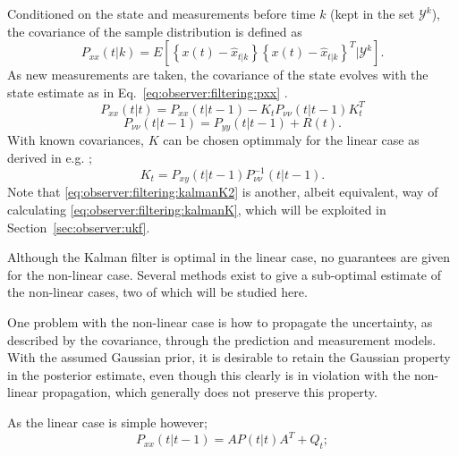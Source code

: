     Conditioned on the state and measurements before time $k$ (kept in the set $\mathcal{Y}^{k}$), the
    covariance of the sample distribution is defined as
    \begin{equation}
        P_{xx}(t|k) = E \left[ \left\lbrace x(t) - \hat{x}_{t|k} \right\rbrace
                               \left\lbrace x(t) - \hat{x}_{t|k} \right\rbrace^{T}
                               | \mathcal{Y}^{k} \right] .
    \end{equation}
    As new measurements are taken, the covariance of the state evolves
    with the state estimate as in Eq.~\eqref{eq:observer:filtering:pxx} \citep{Julier95anewapproach}.
    \begin{equation}
        \label{eq:observer:filtering:pxx}
        P_{xx}(t|t) = P_{xx}(t|t-1) - K_{t}P_{\nu\nu}(t|t-1)K_{t}^{T}
    \end{equation}
    \begin{equation}
        \label{eq:observer:filtering:pnunu}
        P_{\nu\nu}(t|t-1) = P_{yy}(t|t-1) + R(t) .
    \end{equation}
    With known covariances, $K$ can be chosen optimmaly for the linear case as derived in e.g. \citep{gustafsson2010statistical};
    \begin{equation}
        \label{eq:observer:filtering:kalmanK2}
        K_{t} = P_{xy}(t|t-1)P_{\nu\nu}^{-1}(t|t-1).
    \end{equation}
    Note that \eqref{eq:observer:filtering:kalmanK2} is another, albeit equivalent,
    way of calculating \eqref{eq:observer:filtering:kalmanK}, which will be exploited
    in Section~\ref{sec:observer:ukf}.

    Although the Kalman filter is optimal in the linear case, no guarantees are given for the non-linear case.
    Several methods exist to give a sub-optimal estimate of the non-linear cases,
    two of which will be studied here.

    One problem with the non-linear case is how to propagate the uncertainty,
    as described by the covariance, through the prediction and measurement models.
    With the assumed Gaussian prior, it is desirable to retain the Gaussian
    property in the posterior estimate, even though this clearly is in violation with the
    non-linear propagation, which generally does not preserve this property.

    As the linear case is simple however;
    \begin{equation}
        P_{xx}(t|t-1) = AP(t|t)A^{T} + Q_{t};
    \end{equation}

